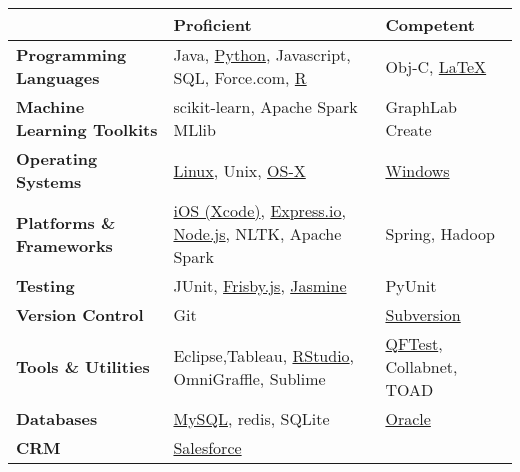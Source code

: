 \begin{table*}[h]
    \begin{tabular}{|lll|}
        \hline \bfseries  & \bfseries Proficient & \bfseries Competent \\\hline 
        \hline \bfseries Programming Languages & Java, \href{http://www.greenteapress.com/thinkpython/html/index.html}{Python}, Javascript, SQL, Force.com,  \href{http://www.mathworks.com/}{R}  &  Obj-C, \href{http://www.latex-project.org/}{\LaTeX}   \\
         \hline \bfseries Machine Learning Toolkits & scikit-learn, Apache Spark MLlib &  GraphLab Create  \\
        \hline \bfseries Operating Systems &  \href{http://www.linux.org/}{Linux}, Unix, \href{https://developer.apple.com/}{OS-X}  & \href{http://windows.microsoft.com/en-us/windows/home}{Windows}  \\
        \hline \bfseries Platforms \& Frameworks & \href{https://developer.apple.com/devcenter/ios/index.action}{iOS (Xcode)}, \href{http://express-io.org/}{Express.io}, \href{http://nodejs.org/}{Node.js}, NLTK, Apache Spark & Spring, Hadoop \\
        \hline \bfseries Testing &  JUnit,  \href{http://frisbyjs.com/}{Frisby.js}, \href{https://github.com/pivotal/jasmine}{Jasmine}&PyUnit\\
        \hline \bfseries Version Control & {Git}  & \href{http://subversion.apache.org/}{Subversion}\\
        \hline \bfseries Tools \& Utilities & Eclipse,Tableau, \href{https://www.rstudio.com/}{RStudio}, OmniGraffle, Sublime &\href{http://www.qfs.de/en/qftest/} {QFTest}, Collabnet, TOAD \\
        \hline \bfseries Databases & \href{http://www.mysql.com/}{MySQL}, redis, SQLite& \href{http://www.oracle.com/}{Oracle}  \\
         \hline \bfseries CRM & \href{http://www.salesforce.com/}{Salesforce} &\\
        \hline 
     \end{tabular}
   \end{table*}


